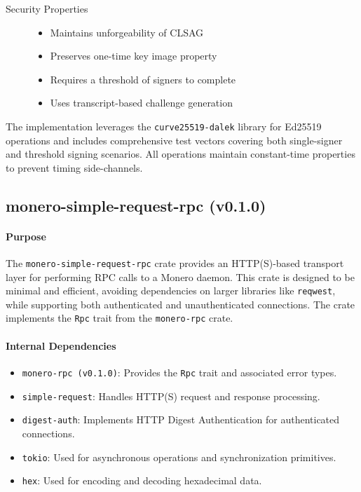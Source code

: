\begin{description}
\item[Security Properties]  \hfill %

\begin{itemize}
\item Maintains unforgeability of CLSAG
\item Preserves one-time key image property
\item Requires a threshold of signers to complete
\item Uses transcript-based challenge generation
\end{itemize}
\end{description}

The implementation leverages the \texttt{curve25519-dalek} library for Ed25519 operations and includes comprehensive test vectors covering both single-signer and threshold signing scenarios.  
All operations maintain constant-time properties to prevent timing side-channels.  


\subsection{monero-simple-request-rpc (v0.1.0)}

\paragraph{Purpose}
The \texttt{monero-simple-request-rpc} crate provides an HTTP(S)-based transport layer for performing RPC calls to a Monero daemon.  This crate is designed to be minimal and efficient, avoiding dependencies on larger libraries like \texttt{reqwest}, while supporting both authenticated and unauthenticated connections.  The crate implements the \texttt{Rpc} trait from the \texttt{monero-rpc} crate.

\paragraph{Internal Dependencies}
\begin{itemize}
    \item \texttt{monero-rpc (v0.1.0)}: Provides the \texttt{Rpc} trait and associated error types.  
    \item \texttt{simple-request}: Handles HTTP(S) request and response processing.  
    \item \texttt{digest-auth}: Implements HTTP Digest Authentication for authenticated connections.  
    \item \texttt{tokio}: Used for asynchronous operations and synchronization primitives.  
    \item \texttt{hex}: Used for encoding and decoding hexadecimal data.
\end{itemize}

